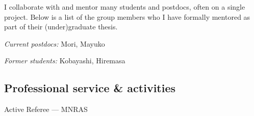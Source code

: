 \documentclass[12pt,letterpaper]{article}
\begin{document}
I collaborate with and mentor many students and postdocs, often on a single
project.
Below is a list of the group members who I have formally mentored as part of their (under)graduate thesis.

\begin{list}{}{\cvlist}
\item \emph{Current postdocs:}
  Mori, Mayuko
\item \emph{Former students:}
  Kobayashi, Hiremasa
\end{list}




\subsection{Professional service \& activities}
\begin{list}{}{\cvlist}
  \item Active Referee ---
        MNRAS
\end{list}
\end{document}
